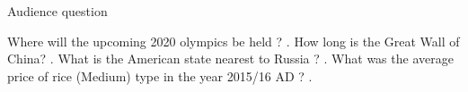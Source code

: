 \documentclass[10pt,a4paper,answers]{exam}
\begin{document}
\vspace{2cm}

{\Large Audience question}

\begin{questions}
\question Where will the upcoming 2020 olympics be held ? .
\question How long is the Great Wall of China? \fillin[21200 kilometres][3cm].
\question What is the American state nearest to Russia ? \fillin[Alaska][3cm].
\question What was the average price of rice (Medium) type in the year 2015/16 AD ? \fillin[Rs 63][3cm].

\end{questions}
\end{document}
